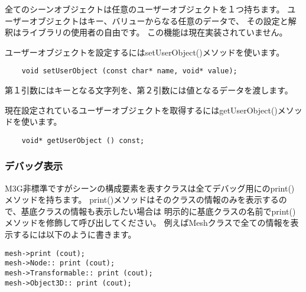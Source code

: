全てのシーンオブジェクトは任意のユーザーオブジェクトを１つ持ちます。
ユーザーオブジェクトはキー、バリューからなる任意のデータで、
その設定と解釈はライブラリの使用者の自由です。
この機能は現在実装されていません。

ユーザーオブジェクトを設定するにはsetUserObject()メソッドを使います。

\begin{verbatim}
    void setUserObject (const char* name, void* value);
\end{verbatim}

第１引数にはキーとなる文字列を、第２引数には値となるデータを渡します。

現在設定されているユーザーオブジェクトを取得するにはgetUserObject()メソッドを使います。

\begin{verbatim}
    void* getUserObject () const;
\end{verbatim}


\subsubsection{デバッグ表示}

M3G非標準ですがシーンの構成要素を表すクラスは全てデバッグ用にのprint()メソッドを持ちます。
print()メソッドはそのクラスの情報のみを表示するので、基底クラスの情報も表示したい場合は
明示的に基底クラスの名前でprint()メソッドを修飾して呼び出してください。
例えばMeshクラスで全ての情報を表示するには以下のように書きます。

\begin{verbatim}
mesh->print (cout);
mesh->Node:: print (cout);
mesh->Transformable:: print (cout);
mesh->Object3D:: print (cout);
\end{verbatim}




\begin{verbatim}
\end{verbatim}




